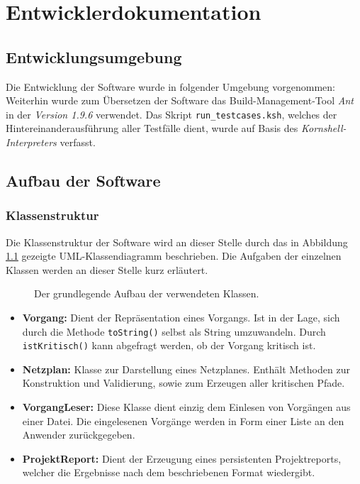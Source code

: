 \chapter{Entwicklerdokumentation}
\label{Entwicklerdokumentation}

\section{Entwicklungsumgebung}
Die Entwicklung der Software wurde in folgender Umgebung vorgenommen:
\makeenvironment
Weiterhin wurde zum \"Ubersetzen der Software das
Build-Management-Tool \textit{Ant} in der \textit{Version 1.9.6}
verwendet. Das Skript \texttt{run\_testcases.ksh}, welches der
Hintereinanderausf\"uhrung aller Testf\"alle dient, wurde auf Basis
des \textit{Kornshell-Interpreters} verfasst.

\section{Aufbau der Software}

\subsection{Klassenstruktur}

Die Klassenstruktur der Software wird an dieser Stelle durch das in
Abbildung \ref{klassendiagramm} gezeigte UML-Klassendiagramm
beschrieben. Die Aufgaben der einzelnen Klassen werden an dieser
Stelle kurz erl\"autert.
\begin{figure}
  \resizebox{\textwidth}{!}{
    
  }
  \caption{Der grundlegende Aufbau der verwendeten Klassen.}
  \label{klassendiagramm}
\end{figure}

\begin{itemize}
  \item \textbf{Vorgang:} Dient der Repr\"asentation eines
    Vorgangs. Ist in der Lage, sich durch die Methode
    \texttt{toString()} selbst als String umzuwandeln. Durch
    \texttt{istKritisch()} kann abgefragt werden, ob der Vorgang
    kritisch ist.
  \item \textbf{Netzplan:} Klasse zur Darstellung eines
    Netzplanes. Enth\"alt Methoden zur Konstruktion und Validierung,
    sowie zum Erzeugen aller kritischen Pfade.
  \item \textbf{VorgangLeser:} Diese Klasse dient einzig dem Einlesen
    von Vorg\"angen aus einer Datei. Die eingelesenen Vorg\"ange
    werden in Form einer Liste an den Anwender zur\"uckgegeben.
  \item \textbf{ProjektReport:} Dient der Erzeugung eines persistenten
    Projektreports, welcher die Ergebnisse nach dem beschriebenen
    Format wiedergibt.
\end{itemize}

